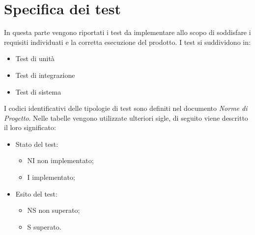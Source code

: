 \section{Specifica dei test}
In questa parte vengono riportati i test da implementare allo scopo
di soddisfare i requisiti individuati e la corretta esecuzione del prodotto.
I test si suddividono in:
\begin{itemize}
    \item Test di unità
    \item Test di integrazione
    \item Test di sistema
\end{itemize}
I codici identificativi delle tipologie di test sono definiti nel documento \emph{Norme di Progetto}.
Nelle tabelle vengono utilizzate ulteriori sigle, di seguito viene descritto il loro significato:
\begin{itemize}
    \item Stato del test:
    \begin{itemize}
        \item NI non implementato;
        \item I implementato;
    \end{itemize}
    \item Esito del test:
    \begin{itemize}
        \item NS non superato;
        \item S superato.
    \end{itemize}
\end{itemize}

